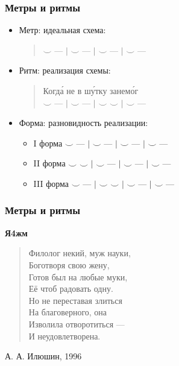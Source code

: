 \documentclass{beamer}
\begin{document}
\begin{frame}
\frametitle{Метры и ритмы}

\begin{itemize}
\item Метр: идеальная схема: \\
\begin{verse}
$\smile$ --- $\mid$ $\smile$ --- $\mid$ $\smile$ --- $\mid$ $\smile$ ---
\end{verse}
\item Ритм: реализация схемы:\\
\begin{verse}
 Когд\'{а} не в ш\'{у}тку занем\'{о}г\\
 $\smile$ --- $\mid$ $\smile$ --- $\mid$ $\smile$ $\smile$ $\mid$ $\smile$ ---
\end{verse}
\item Форма: разновидность реализации:
\begin{itemize}
\item I форма $\smile$ --- $\mid$ $\smile$ --- $\mid$ $\smile$ --- $\mid$ $\smile$ ---
\item II форма $\smile$ $\smile$ $\mid$ $\smile$ --- $\mid$ $\smile$ --- $\mid$ $\smile$ ---
\item III форма $\smile$ --- $\mid$ $\smile$ $\smile$ $\mid$ $\smile$ --- $\mid$ $\smile$ ---
\end{itemize}
\end{itemize}


\end{frame}


\begin{frame}
\frametitle{Метры и ритмы}

\textbf{Я4жм}
\begin{verse}
Филолог некий, муж науки,\\
Боготворя свою жену,\\
Готов был на любые муки,\\
Её чтоб радовать одну.\\
Но не переставая злиться\\
На благоверного, она\\
Изволила отворотиться —\\
И неудовлетворена.
\end{verse}

А. А. Илюшин, 1996

\end{frame}
\end{document}
